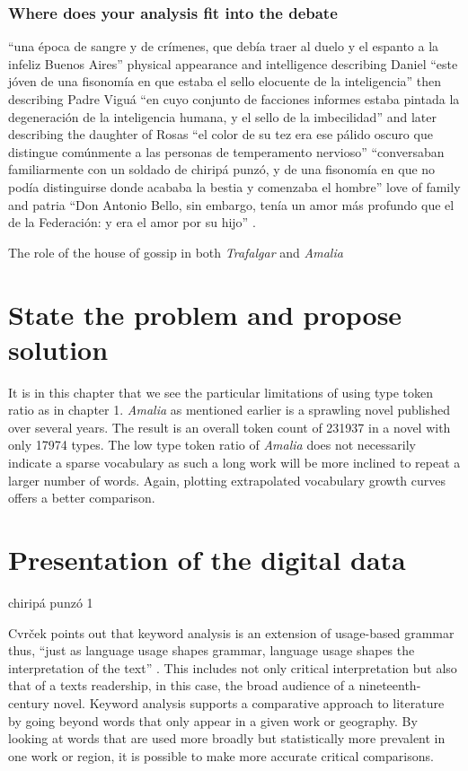 \documentclass[12pt]{report}
\begin{document}
\subsubsection{Where does your analysis fit into the debate}
\enquote{una época de sangre y de crímenes, que debía traer al duelo y el espanto a la infeliz Buenos Aires} \autocite[30]{Marmol1926}
physical appearance and intelligence describing Daniel \enquote{este jóven de una fisonomía en que estaba el sello elocuente de la inteligencia}
then describing Padre Viguá \enquote{en cuyo conjunto de facciones informes estaba pintada la degeneración de la inteligencia humana, y el sello de la imbecilidad}	
and later describing the daughter of Rosas \enquote{el color de su tez era ese pálido oscuro que distingue comúnmente a las personas de temperamento nervioso}
\autocite[41]{Marmol1926}
\enquote{conversaban familiarmente con un soldado de chiripá punzó, y de una fisonomía en que no podía distinguirse donde acababa la bestia y comenzaba el hombre} \autocite[52]{Marmol1926}
love of family and patria \enquote{Don Antonio Bello, sin embargo, tenía un amor más profundo que el de la Federación: y era el amor por su hijo} \autocite[34]{Marmol1926}. 

The role of the house of gossip in both \textit{Trafalgar} and \textit{Amalia}

\section{State the problem and propose solution}
It is in this chapter that we see the particular limitations of using type token ratio as in chapter 1.
\textit{Amalia} as mentioned earlier is a sprawling novel published over several years.
The result is an overall token count of 231937 in a novel with only 17974 types.
The low type token ratio of \textit{Amalia} does not necessarily indicate a sparse vocabulary as such a long work will be more inclined to repeat a larger number of words.
Again, plotting extrapolated vocabulary growth curves offers a better comparison.






\section{Presentation of the digital data}
chiripá punzó	1

Cvrček points out that keyword analysis is an extension of usage-based grammar thus, \enquote{just as language usage shapes grammar, language usage shapes the interpretation of the text} \autocite{Cvrcek https://www.aatseel.org/100111/pdf/4a8_3_cvrek.pdf}. 
This includes not only critical interpretation but also that of a texts readership, in this case, the broad audience of a nineteenth-century novel.
Keyword analysis supports a comparative approach to literature by going beyond words that only appear in a given work or geography.
By looking at words that are used more broadly but statistically more prevalent in one work or region, it is possible to make more accurate critical comparisons.
\end{document}
